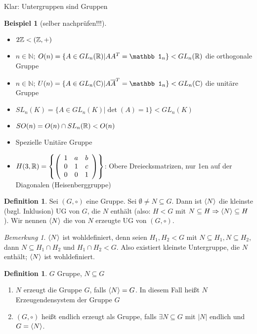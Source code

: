 \documentclass[12pt,a4paper]{article}
\newcounter{defcounter}[subsection]
\theoremstyle{definition}
\newtheorem{defi}[defcounter]{Definition}
\theoremstyle{remark}
\newtheorem*{bem}{Bemerkung}
\theoremstyle{definition}
\theoremstyle{definition}
\newtheorem*{bsp}{Beispiel}
\theoremstyle{plain}
\theoremstyle{plain}
\begin{document}
Klar: Untergruppen sind Gruppen
\begin{bsp}[selber nachprüfen!!!]
	\leavevmode
	\begin{itemize}
		\item $2\mathbb Z < (\mathbb Z, +)$
		\item $n\in\mathbb N$; $O(n) = \{A\in GL_n(\IR)|AA^{T} = \mathbb 1_n\}< GL_n(\IR)$ die orthogonale Gruppe
		\item  $n\in\mathbb N$; $U(n) = \{A\in GL_n(\IC)|A\overline A^{T} = \mathbb 1_n\}< GL_n(\IC)$ die unitäre Gruppe
		\item $SL_n(K) = \{A\in GL_n(K)|\det(A)=1\}<GL_n(K)$
		\item $SO(n) = O(n)\cap SL_n(\mathbb R)<O(n)$
		\item Spezielle Unitäre Gruppe
		\item $H(3,\mathbb R) = \left\{\left(\begin{array}{ccc}
			1 & a & b \\ 
			0 & 1 & c \\ 
			0 & 0 & 1
		\end{array}\right) \right\}$: Obere Dreiecksmatrizen, nur 1en auf der Diagonalen (Heisenberggruppe)
	
	\end{itemize}
\end{bsp}

\begin{defi}
	Sei $(G,\circ)$ eine Gruppe. Sei $\emptyset\neq N\subseteq G$. Dann ist $\langle N\rangle$ die kleinste (bzgl. Inklusion) UG von $G$, die $N$ enthält (also: $H<G$ mit $N\subseteq H\Rightarrow \langle N\rangle\subseteq H$). Wir nennen $\langle N\rangle$ die von $N$ erzeugte UG von $(G,\circ)$.
\end{defi}

\begin{bem}
	$\langle N\rangle$ ist wohldefiniert, denn seien $H_1, H_2<G$ mit $N\subseteq H_1, N\subseteq H_2$, dann $N\subseteq H_1\cap H_2$ und $H_1\cap H_2<G$. Also existiert kleinste Untergruppe, die $N$ enthält; $\langle N\rangle$ ist wohldefiniert.
\end{bem}

\begin{defi}
	$G$ Gruppe, $N\subseteq G$
	\begin{enumerate}
		\item $N$ erzeugt die Gruppe $G$, falls $\langle N\rangle = G$. In diesem Fall heißt $N$ Erzeugendensystem der Gruppe $G$
		\item $(G,\circ)$ heißt endlich erzeugt als Gruppe, falls $\exists N\subseteq G$ mit $|N|$ endlich und $G = \langle N\rangle$.
	\end{enumerate}
\end{defi}
\end{document}

